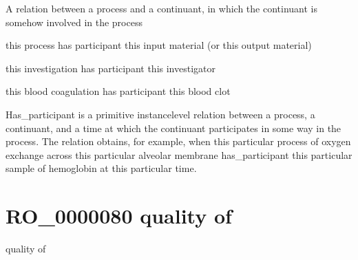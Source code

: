 \documentclass[letterpaper,10pt,english]{sphinxmanual}
\begin{document}
\begin{sphinxShadowBox}

\sphinxAtStartPar
A relation between a process and a continuant, in which the continuant is somehow involved in the process
\end{sphinxShadowBox}

\begin{sphinxShadowBox}

\sphinxAtStartPar
this process has participant this input material (or this output material)

\sphinxAtStartPar
this investigation has participant this investigator

\sphinxAtStartPar
this blood coagulation has participant this blood clot
\end{sphinxShadowBox}

\begin{sphinxShadowBox}

\sphinxAtStartPar
Has\_participant is a primitive instance\sphinxhyphen{}level relation between a process, a continuant, and a time at which the continuant participates in some way in the process. The relation obtains, for example, when this particular process of oxygen exchange across this particular alveolar membrane has\_participant this particular sample of hemoglobin at this particular time.
\end{sphinxShadowBox}

\begin{sphinxShadowBox}

\sphinxAtStartPar
{}
\end{sphinxShadowBox}
\begin{quote}
\label{\detokenize{doc-RO_0000080:ro-0000080}}\label{\detokenize{doc-RO_0000080:quality-of}}\label{\detokenize{doc-RO_0000080:ro-0000080}}
\ignorespaces \end{quote}


\section{RO\_0000080 \sphinxhyphen{} quality of}
\label{\detokenize{doc-RO_0000080:ro-0000080-quality-of}}\label{\detokenize{doc-RO_0000080:index-0}}\label{\detokenize{doc-RO_0000080::doc}}
\begin{sphinxShadowBox}

\sphinxAtStartPar
quality of
\end{sphinxShadowBox}
\end{document}
